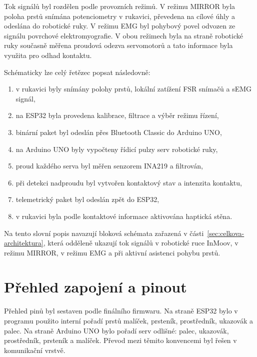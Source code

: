 \documentclass[FZS,DP]{tulthesis}
\begin{document}
Tok signálů byl rozdělen podle provozních režimů. V režimu MIRROR byla poloha prstů snímána potenciometry v rukavici, převedena na cílové úhly a odeslána do robotické ruky. V režimu EMG byl pohybový povel odvozen ze signálu povrchové elektromyografie. V obou režimech byla na straně robotické ruky současně měřena proudová odezva servomotorů a tato informace byla využita pro odhad kontaktu.

Schématicky lze celý řetězec popsat následovně:

\begin{enumerate}
    \item v rukavici byly snímány polohy prstů, lokální zatížení FSR snímačů a sEMG signál,
    \item na ESP32 byla provedena kalibrace, filtrace a výběr režimu řízení,
    \item binární paket byl odeslán přes Bluetooth Classic do Arduino UNO,
    \item na Arduino UNO byly vypočteny řídicí pulzy serv robotické ruky,
    \item proud každého serva byl měřen senzorem INA219 a filtrován,
    \item při detekci nadproudu byl vytvořen kontaktový stav a intenzita kontaktu,
    \item telemetrický paket byl odeslán zpět do ESP32,
    \item v rukavici byla podle kontaktové informace aktivována haptická stěna.
\end{enumerate}

Na tento slovní popis navazují bloková schémata zařazená v části~\ref{sec:celkova-architektura}, která odděleně ukazují tok signálů v robotické ruce InMoov, v režimu MIRROR, v režimu EMG a při aktivní asistenci pohybu prstů.

\section{Přehled zapojení a pinout}
\label{sec:pinout}

Přehled pinů byl sestaven podle finálního firmwaru. Na straně ESP32 bylo v programu použito interní pořadí prstů malíček, prsteník, prostředník, ukazovák a palec. Na straně Arduino UNO bylo pořadí serv odlišné: palec, ukazovák, prostředník, prsteník a malíček. Převod mezi těmito konvencemi byl řešen v komunikační vrstvě. 
\end{document}
